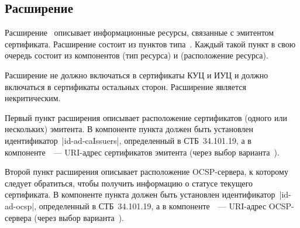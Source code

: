 
\subsection{Расширение~}\label{FMT.Ext.AIA}

Расширение~ описывает информационные ресурсы, 
связанные с эмитентом сертификата.
%
Расширение состоит из пунктов типа~. 
Каждый такой пункт в свою очередь состоит из компонентов 
 (тип ресурса) и  
(расположение ресурса). 

Расширение не должно включаться в сертификаты КУЦ и ИУЦ и должно 
включаться в сертификаты остальных сторон. Расширение является некритическим.

Первый пункт расширения описывает расположение сертификатов (одного или
нескольких) эмитента. В компоненте  пункта должен быть
установлен идентификатор~\code|id-ad-caIssuers|, определенный в СТБ~34.101.19,
%
а в компоненте~~--- URI-адрес сертификатов эмитента
(через выбор варианта~).

Второй пункт расширения описывает расположение OCSP-сервера, к которому следует 
обратиться, чтобы получить информацию о статусе текущего сертификата.
В компоненте  пункта должен быть установлен 
идентификатор~\code|id-ad-ocsp|, определенный в СТБ~34.101.19,
%
а в компоненте~~--- URI-адрес OCSP-сервера
(через выбор варианта~).
